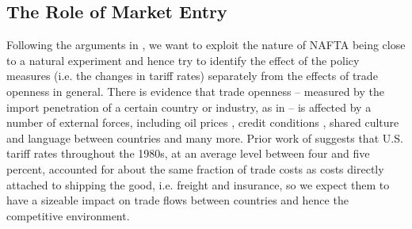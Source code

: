
\subsection{The Role of Market Entry}
Following the arguments in \citet{Trefler2004}, we want to exploit the nature of NAFTA being close to a natural experiment and hence try to identify the effect of the policy measures (i.e. the changes in tariff rates) separately from the effects of trade openness in general. There is evidence that trade openness -- measured by the import penetration of a certain country or industry, as in \citet{Chen2009} -- is affected by a number of external forces, including oil prices \citep{Kilian2009}, credit conditions \citep{Chor2012}, shared culture and language between countries and many more. Prior work of \citet{Bernard2006} suggests that U.S. tariff rates throughout the 1980s, at an average level between four and five percent, accounted for about the same fraction of trade costs as costs directly attached to shipping the good, i.e. freight and insurance, so we expect them to have a sizeable impact on trade flows between countries and hence the competitive environment. \vspace{0.5cm} \\

